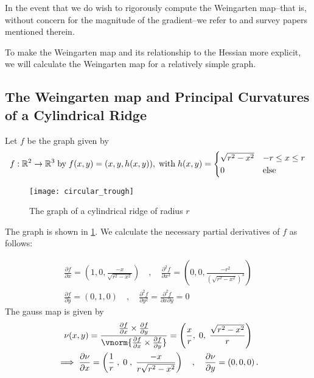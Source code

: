 In the event that we do wish to rigorously compute the Weingarten map--that is, without concern for the magnitude of the gradient--we refer to \cite{jiao2008consistent} and survey papers mentioned therein.

  
  To make the Weingarten map and its relationship to the Hessian more explicit, we will calculate the Weingarten map for a relatively simple graph.
  
  \subsection{The Weingarten map and Principal Curvatures of a Cylindrical Ridge} \label{sec:calculate-weinmap-of-a-ridge}
  
  Let $f$ be the graph given by 
  \begin{equation}
   f: \mathbb{R}^2 \to \mathbb{R}^3 \;\textrm{by}\; f(x,y) = (x,y,h(x,y)), \;\textrm{with}\;
   h(x,y) = \begin{cases}
    \sqrt{r^2 - x^2} & -r \le x \le r \\
    0 & \textrm{else}
    \end{cases}
  \end{equation} 
  \begin{figure}[h!]
  \texttt{[image: circular\_trough]}
  \caption{The graph of a cylindrical ridge of radius $r$}
  \label{fig:ridge-graph}
  \end{figure}
  
  
  The graph is shown in \cref{fig:ridge-graph}. We calculate the necessary partial derivatives of $f$ as follows:
  
  \begin{gather}
  \frac{\partial f}{\partial x} = \left(1, 0, \frac{-x}{\sqrt{r^2 - x^2}}\right)
  \quad , \quad
  \frac{\partial^2 f}{\partial x^2} = \left(0, 0, \frac{-r^2}{\left(\sqrt{r^2 - x^2}\right)^3}\right) \\
  \frac{\partial f}{\partial y} = \left(0, 1, 0\right)
  \quad , \quad
  \frac{\partial^2 f}{\partial y^2} = \frac{\partial^2 f}{\partial x \partial y} = 0
  \end{gather}
  The gauss map is given by
  \begin{gather}
  \nu(x,y) = \frac{\frac{\partial f}{\partial x} \times \frac{\partial f}{\partial y}}
  {\vnorm{\frac{\partial f}{\partial x} \times \frac{\partial f}{\partial y}}}
  = \left( \frac{x}{r} ,\; 0 ,\; \frac{\sqrt{r^2 - x^2}}{r} \right) \\
\implies
\frac{\partial \nu}{\partial x}
 = \left(\frac{1}{r} \;,\; 0\;,\; \frac{-x}{r\sqrt{r^2-x^2}}\right)
 \quad , \quad \frac{\partial \nu}{\partial y} = \left(0,0,0\right).
  \end{gather}
  
